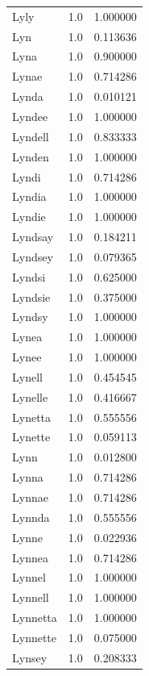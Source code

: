 \documentclass[
  letterpaper,
  DIV=11,
  numbers=noendperiod]{scrreprt}
\begin{document}
\begin{tabular}{lrr}
Lyly            &   1.0 &   1.000000 \\
Lyn             &   1.0 &   0.113636 \\
Lyna            &   1.0 &   0.900000 \\
Lynae           &   1.0 &   0.714286 \\
Lynda           &   1.0 &   0.010121 \\
Lyndee          &   1.0 &   1.000000 \\
Lyndell         &   1.0 &   0.833333 \\
Lynden          &   1.0 &   1.000000 \\
Lyndi           &   1.0 &   0.714286 \\
Lyndia          &   1.0 &   1.000000 \\
Lyndie          &   1.0 &   1.000000 \\
Lyndsay         &   1.0 &   0.184211 \\
Lyndsey         &   1.0 &   0.079365 \\
Lyndsi          &   1.0 &   0.625000 \\
Lyndsie         &   1.0 &   0.375000 \\
Lyndsy          &   1.0 &   1.000000 \\
Lynea           &   1.0 &   1.000000 \\
Lynee           &   1.0 &   1.000000 \\
Lynell          &   1.0 &   0.454545 \\
Lynelle         &   1.0 &   0.416667 \\
Lynetta         &   1.0 &   0.555556 \\
Lynette         &   1.0 &   0.059113 \\
Lynn            &   1.0 &   0.012800 \\
Lynna           &   1.0 &   0.714286 \\
Lynnae          &   1.0 &   0.714286 \\
Lynnda          &   1.0 &   0.555556 \\
Lynne           &   1.0 &   0.022936 \\
Lynnea          &   1.0 &   0.714286 \\
Lynnel          &   1.0 &   1.000000 \\
Lynnell         &   1.0 &   1.000000 \\
Lynnetta        &   1.0 &   1.000000 \\
Lynnette        &   1.0 &   0.075000 \\
Lynsey          &   1.0 &   0.208333 \\

\end{tabular}
\end{document}
